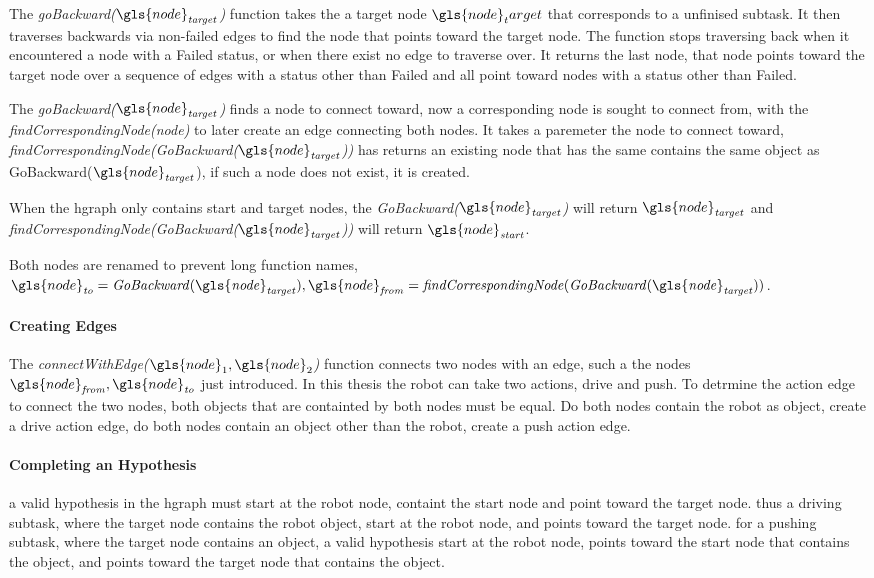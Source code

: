  The \textit{goBackward($\gls{node}_\mathit{target}$)} function takes the a target node $\gls{node}_target$ that corresponds to a unfinised subtask. It then traverses backwards via non-failed edges to find the node that points toward the target node. The function stops traversing back when it encountered a node with a Failed status, or when there exist no edge to traverse over. It returns the last node, that node points toward the target node over a sequence of edges with a status other than Failed and all point toward nodes with a status other than Failed.\bs

The \textit{goBackward($\gls{node}_\mathit{target}$)} finds a node to connect toward, now a corresponding node is sought to connect from, with the \textit{findCorrespondingNode(\gls{node})} to later create an edge connecting both nodes. It takes a paremeter the node to connect toward, \textit{findCorrespondingNode(GoBackward($\gls{node}_\mathit{target}$))} has returns an existing node that has the same contains the same object as GoBackward($\gls{node}_\mathit{target}$), if such a node does not exist, it is created.

When the \ac{hgraph} only contains start and target nodes, the \textit{GoBackward($\gls{node}_\mathit{target}$)} will return $\gls{node}_\mathit{target}$ and \textit{findCorrespondingNode(GoBackward($\gls{node}_\mathit{target}$))} will return $\gls{node}_\mathit{start}$.\bs

Both nodes are renamed to prevent long function names, $\gls{node}_\mathit{to} =  \mathit{GoBackward(\gls{node}_\mathit{target})}, \gls{node}_\mathit{from} = \mathit{findCorrespondingNode(GoBackward(\gls{node}_\mathit{target}))}$.\bs

\paragraph{Creating Edges}
The \textit{connectWithEdge($\gls{node}_1, \gls{node}_2$)} function connects two nodes with an edge, such a the nodes $\gls{node}_\mathit{from}, \gls{node}_\mathit{to}$ just introduced. In this thesis the robot can take two actions, drive and push. To detrmine the action edge to connect the two nodes, both objects that are containted by both nodes must be equal. Do both nodes contain the robot as object, create a drive action edge, do both nodes contain an object other than the robot, create a push action edge.\bs


\paragraph{Completing an Hypothesis}
a valid hypothesis in the \ac{hgraph} must start at the robot node, containt the start node and point toward the target node. thus a driving subtask, where the target node contains the robot object, start at the robot node, and points toward the target node. for a pushing subtask, where the target node contains an object, a valid hypothesis start at the robot node, points toward the start node that contains the object, and points toward the target node that contains the object.\bs

